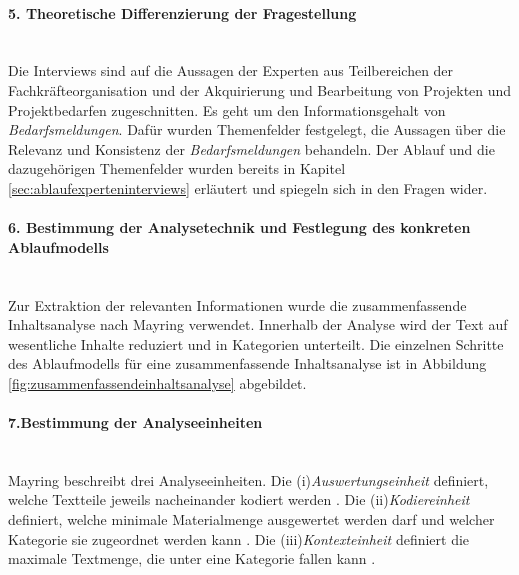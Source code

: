 \paragraph{5. Theoretische Differenzierung der Fragestellung}\mbox{} \\
Die Interviews sind auf die Aussagen der Experten aus Teilbereichen der Fachkräfteorganisation und der Akquirierung und Bearbeitung von Projekten und Projektbedarfen zugeschnitten. Es geht um den Informationsgehalt von \emph{Bedarfsmeldungen}. Dafür wurden Themenfelder festgelegt, die Aussagen über die Relevanz und Konsistenz der \emph{Bedarfsmeldungen} behandeln. Der Ablauf und die dazugehörigen Themenfelder wurden bereits in Kapitel \ref{sec:ablaufexperteninterviews} erläutert und spiegeln sich in den Fragen wider.
\paragraph{6. Bestimmung der Analysetechnik und Festlegung des konkreten Ablaufmodells}\mbox{} \\
Zur Extraktion der relevanten Informationen wurde die zusammenfassende Inhaltsanalyse nach Mayring verwendet. Innerhalb der Analyse wird der Text auf wesentliche Inhalte reduziert und in Kategorien unterteilt. Die einzelnen Schritte des Ablaufmodells für eine zusammenfassende Inhaltsanalyse ist in Abbildung \ref{fig:zusammenfassendeinhaltsanalyse} abgebildet.
\paragraph{7.Bestimmung der Analyseeinheiten}\mbox{} \\
Mayring beschreibt drei Analyseeinheiten. Die (i)\emph{Auswertungseinheit} definiert, welche Textteile jeweils nacheinander kodiert werden \cite{mayring1994qualitative}. Die (ii)\emph{Kodiereinheit} definiert, welche minimale Materialmenge ausgewertet werden darf und welcher Kategorie sie zugeordnet werden kann \cite{mayring1994qualitative}. Die (iii)\emph{Kontexteinheit} definiert die maximale Textmenge, die unter eine Kategorie fallen kann \cite{mayring1994qualitative}.\\

